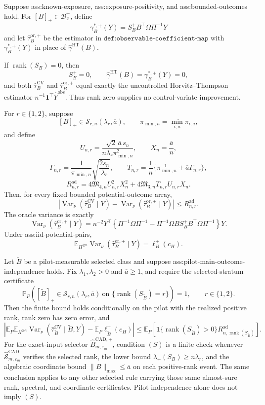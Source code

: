 Suppose ass:known-exposure, ass:exposure-positivity, and ass:bounded-outcomes hold.  For \([B]_+\in\mathcal B_Z^+\), define
\[
\gamma_B^{*,+}(Y)=S_B^+B^{\top}\Omega\Pi^{-1}Y
\]
and let \(\widehat\tau_B^{\mathrm{or},+}\) be the estimator in \(\texttt{def:observable-coefficient-map}\) with \(\gamma_B^{*,+}(Y)\) in place of \(\widehat\gamma^{\mathrm{HT}}(B)\).

If \(\operatorname{rank}(S_B)=0\), then
\[
S_B^+=0,
\qquad
\widehat\gamma^{\mathrm{HT}}(B)=\gamma_B^{*,+}(Y)=0,
\]
and both \(\widehat\tau_B^{\mathrm{CV}}\) and \(\widehat\tau_B^{\mathrm{or},+}\) equal exactly the uncontrolled Horvitz--Thompson estimator \(n^{-1}\mathbf1^{\top}\widehat Y^{\mathrm{obs}}\).  Thus rank zero supplies no control-variate improvement.

For \(r\in\{1,2\}\), suppose
\[
[B]_+\in\mathcal S_{r,n}(\lambda_r,\overline a),
\qquad
\pi_{\min,n}=\min_{i,a}\pi_{i,a},
\]
and define
\[
U_{n,r}=\frac{\sqrt2\,\overline a\,s_n}
{n\lambda_r\pi_{\min,n}^2},
\qquad X_n=\frac{\overline a}{n},
\]
\[
\Gamma_{n,r}=\frac1{\pi_{\min,n}}
\sqrt{\frac{2s_n}{\lambda_r}},
\qquad
T_{n,r}=\frac1n\{\pi_{\min,n}^{-1}
+\overline a\Gamma_{n,r}\},
\]
\[
R_{n,r}^{\mathrm{ad}}
=4\mathfrak M_{4,n}U_{n,r}^2X_n^2
+4\mathfrak M_{3,n}T_{n,r}U_{n,r}X_n.
\]
Then, for every fixed bounded potential-outcome array,
\[
\left|\operatorname{Var}_\nu(\widehat\tau_B^{\mathrm{CV}}\mid Y)
-\operatorname{Var}_\nu(\widehat\tau_B^{\mathrm{or},+}\mid Y)\right|
\le R_{n,r}^{\mathrm{ad}}.
\]
The oracle variance is exactly
\[
\operatorname{Var}_\nu(\widehat\tau_B^{\mathrm{or},+}\mid Y)
=n^{-2}Y^{\top}\left\{\Pi^{-1}\Omega\Pi^{-1}
-\Pi^{-1}\Omega B S_B^+B^{\top}\Omega\Pi^{-1}\right\}Y.
\]
Under ass:iid-potential-pairs,
\[
\mathbb E_{H^{\otimes n}}
\operatorname{Var}_\nu(\widehat\tau_B^{\mathrm{or},+}\mid Y)
=\ell_B^+(c_H).
\]

Let \(\widetilde B\) be a pilot-measurable selected class and suppose ass:pilot-main-outcome-independence holds.  Fix \(\lambda_1,\lambda_2>0\) and \(\overline a\ge1\), and require the selected-stratum certificate
\[
\mathbb P_P\!\left(
[\widetilde B]_+\in\mathcal S_{r,n}(\lambda_r,\overline a)
\ \text{on }\{\operatorname{rank}(S_{\widetilde B})=r\}
\right)=1,
\qquad r\in\{1,2\}.
\tag{S}
\]
Then the finite bound holds conditionally on the pilot with the realized positive rank, rank zero has zero error, and
\[
\left|\mathbb E_P\mathbb E_{H^{\otimes n}}
\operatorname{Var}_\nu(\widehat\tau_{\widetilde B}^{\mathrm{CV}}
\mid\widetilde B,Y)
-\mathbb E_P\ell_{\widetilde B}^+(c_H)\right|
\le\mathbb E_P\!\left[
\mathbf1\{\operatorname{rank}(S_{\widetilde B})>0\}
R_{n,\operatorname{rank}(S_{\widetilde B})}^{\mathrm{ad}}
\right].
\]
For the exact-input selector \(\widehat B_{m,\varepsilon_m}^{\mathrm{CAD},+}\), condition \((S)\) is a finite check whenever \(\widehat{\mathscr S}_{m,\varepsilon_m}^{\mathrm{CAD}}\) verifies the selected rank, the lower bound \(\lambda_+(S_B)\ge n\lambda_r\), and the algebraic coordinate bound \(\lVert B\rVert_{\max}\le\overline a\) on each positive-rank event.  The same conclusion applies to any other selected rule carrying those same almost-sure rank, spectral, and coordinate certificates.  Pilot independence alone does not imply \((S)\).

